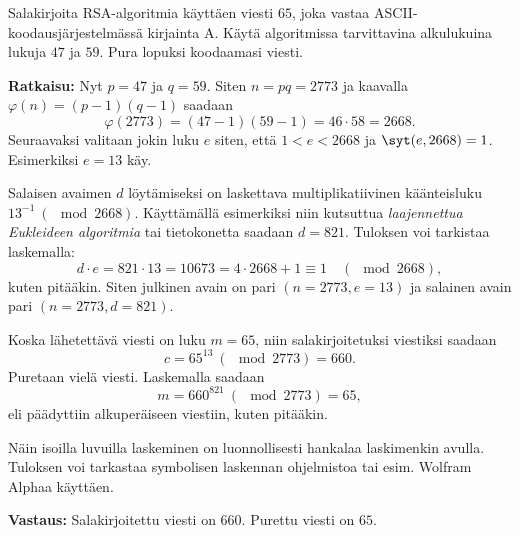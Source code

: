 \begin{esimerkki}
Salakirjoita RSA-algoritmia käyttäen viesti $65$, joka vastaa ASCII-koodausjärjestelmässä kirjainta A. Käytä algoritmissa tarvittavina alkulukuina lukuja $47$ ja $59$. Pura lopuksi koodaamasi viesti.

{\bf Ratkaisu:} 
Nyt $p = 47$ ja $q = 59$. Siten $n=pq=2773$ ja kaavalla $\varphi(n)=(p-1)(q-1)$ saadaan
\[
\varphi(2773)=(47-1)(59-1)=46\cdot 58 =2668.
\]
Seuraavaksi valitaan jokin luku $e$ siten, että $1<e<2668$ ja $\syt(e,2668)=1$. Esimerkiksi $e=13$ käy.

Salaisen avaimen $d$ löytämiseksi on laskettava multiplikatiivinen käänteisluku $13^{-1}\ (\mod 2668)$. Käyttämällä esimerkiksi niin kutsuttua {\em laajennettua Eukleideen algoritmia} tai tietokonetta saadaan $d=821$. Tuloksen voi tarkistaa laskemalla:
\[
d \cdot e = 821 \cdot 13 = 10673 = 4\cdot 2668 + 1 \equiv 1 \quad (\mod 2668),
\]
kuten pitääkin. Siten julkinen avain on pari $(n=2773, e=13)$ ja salainen avain pari $(n=2773, d=821)$.

Koska lähetettävä viesti on luku $m=65$, niin salakirjoitetuksi viestiksi saadaan
\[
c= 65^{13}\ (\mod  2773) = 660.
\]
Puretaan vielä viesti. Laskemalla saadaan
\[
m=660^{821}\ (\mod  2773) = 65,
\]
eli päädyttiin alkuperäiseen viestiin, kuten pitääkin.

Näin isoilla luvuilla laskeminen on luonnollisesti hankalaa laskimenkin avulla. Tuloksen voi tarkastaa symbolisen laskennan ohjelmistoa tai esim. Wolfram Alphaa käyttäen. 

{\bf Vastaus:} Salakirjoitettu viesti on $660$. Purettu viesti on $65$.
\end{esimerkki}



\Harjoitustehtavat

